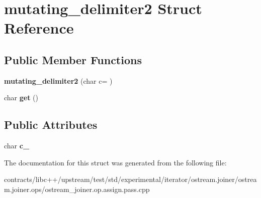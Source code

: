 \hypertarget{structmutating__delimiter2}{}\section{mutating\+\_\+delimiter2 Struct Reference}
\label{structmutating__delimiter2}
\subsection*{Public Member Functions}
\begin{DoxyCompactItemize}
\item 
\mbox{\label{structmutating__delimiter2_a48adb26162a5eb911073618dfdbc10e4}} 
{\bfseries mutating\+\_\+delimiter2} (char c=\textquotesingle{} \textquotesingle{})
\item 
\mbox{\label{structmutating__delimiter2_a47e5dd447d4b7ade37e53c79f08bdc01}} 
char {\bfseries get} ()
\end{DoxyCompactItemize}
\subsection*{Public Attributes}
\begin{DoxyCompactItemize}
\item 
\mbox{\label{structmutating__delimiter2_aaaee5c2762a993dbdfb6fa997a5bd8a5}} 
char {\bfseries c\+\_\+}
\end{DoxyCompactItemize}


The documentation for this struct was generated from the following file\+:\begin{DoxyCompactItemize}
\item 
contracts/libc++/upstream/test/std/experimental/iterator/ostream.\+joiner/ostream.\+joiner.\+ops/ostream\+\_\+joiner.\+op.\+assign.\+pass.\+cpp\end{DoxyCompactItemize}
